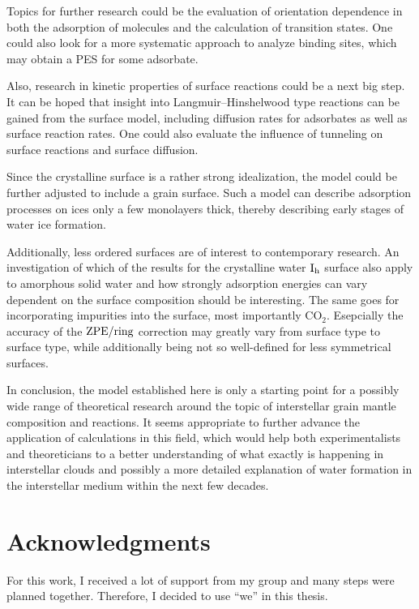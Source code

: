 Topics for further research could be the evaluation of orientation dependence
in both the adsorption of molecules and the calculation of transition states.
One could also look for a more systematic approach to analyze binding sites,
which may obtain a PES for some adsorbate.

Also, research in kinetic properties of surface reactions could be a next big
step. It can be hoped that insight into Langmuir--Hinshelwood type reactions can
be gained from the surface model, including diffusion rates for adsorbates as
well as surface reaction rates. One could also evaluate the influence of
tunneling on surface reactions and surface diffusion.

Since the crystalline surface is a rather strong idealization, the model could
be further adjusted to include a grain surface. Such a model can describe
adsorption processes on ices only a few monolayers thick, thereby describing
early stages of water ice formation.

Additionally, less ordered surfaces are of interest to contemporary research. An
investigation of which of the results for the crystalline water $\text I_\text h$ surface
also apply to amorphous solid water and how strongly adsorption energies can
vary dependent on the surface composition should be interesting. The same goes
for incorporating impurities into the surface, most importantly CO$_2$.
Esepcially the accuracy of the $\text{ZPE}/\text{ring}$ correction may greatly vary from surface type to
surface type, while additionally being not so well-defined for less symmetrical
surfaces.

In conclusion, the model established here is only a starting point for a
possibly wide range of theoretical research around the topic of interstellar
grain mantle composition and reactions. It seems appropriate to further advance
the application of  calculations in this field, which would help
both experimentalists and theoreticians to a better understanding of what
exactly is happening in interstellar clouds and possibly a more detailed
explanation of water formation in the interstellar medium within the next few
decades.

\section*{Acknowledgments}
For this work, I received a lot of support from my group and many steps were
planned together. Therefore, I decided to use ``we'' in this thesis.

